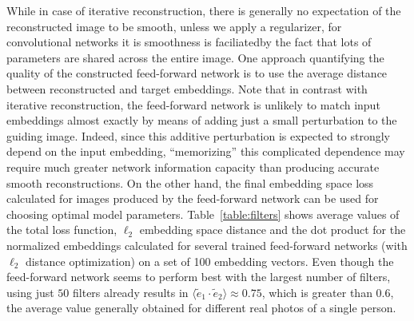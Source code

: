 \documentclass{article}
\newcommand{\avr}[1]{\langle #1 \rangle}
\newcommand{\omtnips}[1]{#1}
\begin{document}
  \omtnips{While in case of iterative reconstruction, there is generally no expectation of the reconstructed image to be smooth, unless we apply a regularizer, for convolutional networks it is
  smoothness is faciliatedby the fact that lots of parameters are shared across the entire image. One approach quantifying the quality of the constructed feed-forward network is to use the
  average distance between reconstructed and target embeddings.}
  Note that in contrast with iterative reconstruction, the feed-forward network is unlikely to match input embeddings almost exactly by means of adding just a small perturbation to the guiding image.
  Indeed, since this additive perturbation is expected to strongly depend on the input embedding, ``memorizing'' this complicated dependence may require much greater network information capacity
  than producing accurate smooth reconstructions. On the other hand, the final embedding space loss calculated for images produced by the feed-forward network can be used for choosing optimal
  model parameters.
  Table~\ref{table:filters} shows average values of the total loss function, $\ell_2$ embedding space distance and the dot product for the normalized embeddings calculated for several trained feed-forward networks (with $\ell_2$ distance optimization) on a set of 100 embedding vectors.
  Even though the feed-forward network seems to perform best with the largest number of filters, using just $50$ filters already results in $\avr{\tilde{e}_1\cdot \tilde{e}_2} \approx 0.75$, which is greater than $0.6$, the average value generally obtained for different real photos of a single person.

  \newcommand\Tstrut{\rule{0pt}{2.6ex}}
  \newcommand\Bstrut{\rule[-0.9ex]{0pt}{0pt}}
\end{document}
